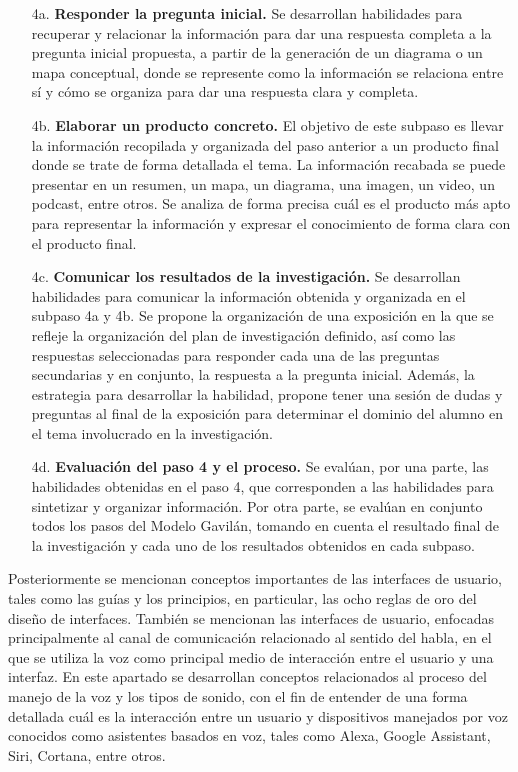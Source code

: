 \begin{itemize}
  \item [4a.] \textbf{Responder la pregunta inicial.} Se desarrollan habilidades para recuperar y relacionar la información para dar una respuesta completa a la pregunta inicial propuesta, a partir de la generación de un diagrama o un mapa conceptual, donde se represente como la información se relaciona entre sí y cómo se organiza para dar una respuesta clara y completa.
  \item [4b.] \textbf{Elaborar un producto concreto.} El objetivo de este subpaso es llevar la información recopilada y organizada del paso anterior a un producto final donde se trate de forma detallada el tema. La información recabada se puede presentar en un resumen, un mapa, un diagrama, una imagen, un video, un podcast, entre otros. Se analiza de forma precisa cuál es el producto más apto para representar la información y expresar el conocimiento de forma clara con el producto final.
  \item [4c.] \textbf{Comunicar los resultados de la investigación.} Se desarrollan habilidades para comunicar la información obtenida y organizada en el subpaso 4a y 4b. Se propone la organización de una exposición en la que se refleje la organización del plan de investigación definido, así como las respuestas seleccionadas para responder cada una de las preguntas secundarias y en conjunto, la respuesta a la pregunta inicial. Además, la estrategia para desarrollar la habilidad, propone tener una sesión de dudas y preguntas al final de la exposición para determinar el dominio del alumno en el tema involucrado en la investigación.
  \item [4d.] \textbf{Evaluación del paso 4 y el proceso.} Se evalúan, por una parte, las habilidades obtenidas en el paso 4, que corresponden a las habilidades para sintetizar y organizar información. Por otra parte, se evalúan en conjunto todos los pasos del Modelo Gavilán, tomando en cuenta el resultado final de la investigación y cada uno de los resultados obtenidos en cada subpaso.
\end{itemize}

Posteriormente se mencionan conceptos importantes de las interfaces de usuario, tales como las guías y los principios, en particular, las ocho reglas de oro del diseño de interfaces. También se mencionan las interfaces de usuario, enfocadas principalmente al canal de comunicación relacionado al sentido del habla, en el que se utiliza la voz como principal medio de interacción entre el usuario y una interfaz. En este apartado se desarrollan conceptos relacionados al proceso del manejo de la voz y los tipos de sonido, con el fin de entender de una forma detallada cuál es la interacción entre un usuario y dispositivos manejados por voz conocidos como asistentes basados en voz, tales como Alexa, Google Assistant, Siri, Cortana, entre otros.

